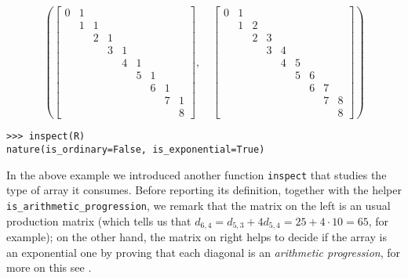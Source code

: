 \begin{example}
\begin{displaymath}
\left ( \left[\begin{matrix}0 & 1 &   &   &   &   &   &   &  \\  & 1 & 1 &   &   &   &   &   &  \\  &   & 2 & 1 &   &   &   &   &  \\  &   &   & 3 & 1 &   &   &   &  \\  &   &   &   & 4 & 1 &   &   &  \\  &   &   &   &   & 5 & 1 &   &  \\  &   &   &   &   &   & 6 & 1 &  \\  &   &   &   &   &   &   & 7 & 1\\  &   &   &   &   &   &   &   & 8\end{matrix}\right], \quad \left[\begin{matrix}0 & 1 &   &   &   &   &   &   &  \\  & 1 & 2 &   &   &   &   &   &  \\  &   & 2 & 3 &   &   &   &   &  \\  &   &   & 3 & 4 &   &   &   &  \\  &   &   &   & 4 & 5 &   &   &  \\  &   &   &   &   & 5 & 6 &   &  \\  &   &   &   &   &   & 6 & 7 &  \\  &   &   &   &   &   &   & 7 & 8\\  &   &   &   &   &   &   &   & 8\end{matrix}\right]\right )
\end{displaymath}
\begin{verbatim}
>>> inspect(R)
nature(is_ordinary=False, is_exponential=True)
\end{verbatim}
\end{example}
In the above example we introduced another function \verb|inspect| that studies
the type of array it consumes. Before reporting its definition, together with
the helper \verb|is_arithmetic_progression|, we remark that the matrix on the
left is an usual production matrix (which tells us that $d_{6,4} = d_{5,3} +
4d_{5,4} = 25 + 4\cdot 10 = 65$, for example); on the other hand, the matrix on
right helps to decide if the array is an exponential one by proving that each
diagonal is an \textit{arithmetic progression}, for more on this see
\citep{barry2017riordan}.



